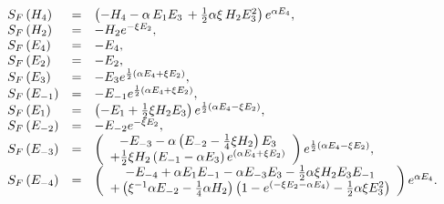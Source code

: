 \begin{equation}
\begin{array}{lcl}
S_{F}\left( H_{4}\right)  & = & \left( -H_{4}-\alpha \,E_{1}E_{3}\,+\frac{1}{%
2}\alpha \xi \,H_{2}E_{3}^{2}\right) e^{\alpha {E}_{4}}, \\
S_{F}\left( H_{2}\right)  & = & -H_{2}e^{-\xi {E}_{2}}, \\
S_{F}\left( {E}_{4}\right)  & = & -{E}_{4}, \\
S_{F}\left( {E}_{2}\right)  & = & -{E}_{2}, \\
S_{F}\left( E_{3}\right)  & = & - E_{3}e^{\frac{1}{2}\left( \alpha {E}%
_{4}+ \xi {E}_{2}\right) }, \\
S_{F}\left( E_{-1}\right)  & = & -E_{-1}e^{\frac{1}{2}\left( \alpha {E%
}_{4} +\xi {E}_{2}\right) }, \\
S_{F}\left( E_{1}\right)  & = & \left( -E_{1}+\frac{1}{2}\xi
H_{2}E_{3}\right) e^{\frac{1}{2}\left( \alpha {E}_{4} - \xi {E}%
_{2}\right) }, \\
S_{F}\left( E_{-2}\right)  & = & -E_{-2}e^{-\xi {E}_{2}}, \\
S_{F}\left( E_{-3}\right)  & = & \left(
\begin{array}{c}
 -E_{-3}-\alpha \left( E_{-2}
-\frac{1}{4}\xi H_2 \right)E_{3} \\
+\frac{1}{2%
}\xi H_{2}\left( E_{-1}-\alpha E_{3}\right) e^{\left( \alpha {E}%
_{4}+\xi {E}_{2}\right) }
\end{array}
\right) e^{\frac{1}{2}\left( \alpha {E%
}_{4} - \xi {E}_{2}\right) }, \\
S_{F}\left( E_{-4}\right)  & = & \left(
\begin{array}{c}
-E_{-4}+\alpha E_{1}E_{-1}- \alpha E_{-3}E_{3}
-\frac{1}{2}\alpha \xi H_{2}E_{3}E_{-1}
\\
+\left( \xi ^{-1}\alpha E_{-2}-\frac{1}{4}\alpha H_{2}\right) \left(
1-e^{\left(- \xi {E}_{2}-\alpha {E}_{4}\right) }-\frac{1}{2}%
\alpha \xi E_{3}^{2}\right)
\end{array}
\right) e^{\alpha {E}_{4}}.
\end{array}
\end{equation}

